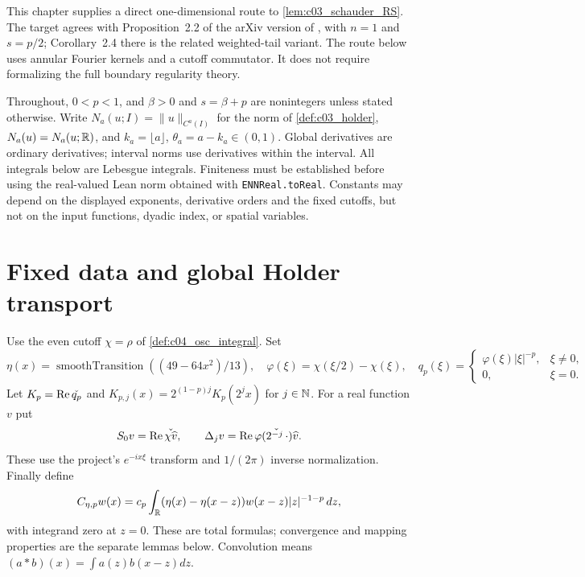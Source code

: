\label{sec:c12_schauder}

This chapter supplies a direct one-dimensional route to \cref{lem:c03_schauder_RS}.
The target agrees with Proposition~2.2 of the arXiv version of
\cite{RosOton-Serra:dirichlet-fractional-laplacian}, with $n=1$ and $s=p/2$;
Corollary~2.4 there is the related weighted-tail variant.
The route below uses annular Fourier kernels and a cutoff commutator. It does not
require formalizing the full boundary regularity theory.

Throughout, $0<p<1$, and $\beta>0$ and $s=\beta+p$ are nonintegers unless stated otherwise.
Write $N_a(u;I)=\|u\|_{C^a(I)}$ for the norm of \cref{def:c03_holder},
$N_a(u)=N_a(u;\R)$, and $k_a=\lfloor a\rfloor$, $\theta_a=a-k_a\in(0,1)$.
Global derivatives are ordinary derivatives; interval norms use derivatives within the interval.
All integrals below are Lebesgue integrals. Finiteness must be established before using the
real-valued Lean norm obtained with \texttt{ENNReal.toReal}.
Constants may depend on the displayed exponents, derivative orders and the fixed cutoffs,
but not on the input functions, dyadic index, or spatial variables.

\section{Fixed data and global Holder transport}

\begin{definition}
  \label{def:c12_schauder_data}
  Use the even cutoff $\chi=\rho$ of \cref{def:c04_osc_integral}. Set
  \[
    \eta(x)=\operatorname{smoothTransition}((49-64x^2)/13),\quad
    \varphi(\xi)=\chi(\xi/2)-\chi(\xi),\quad
    q_p(\xi)=\begin{cases}\varphi(\xi)|\xi|^{-p},&\xi\ne0,\\0,&\xi=0.\end{cases}
  \]
  Let $K_p=\operatorname{Re}\widecheck{q_p}$ and
  $K_{p,j}(x)=2^{(1-p)j}K_p(2^jx)$ for $j\in\N$.
  For a real function $v$ put
  \[
    S_0v=\operatorname{Re}\widecheck{\chi\widehat v},\qquad
    \Delta_jv=\operatorname{Re}\widecheck{\varphi(2^{-j}\,\cdot)\widehat v}.
  \]
  These use the project's $e^{-ix\xi}$ transform and $1/(2\pi)$ inverse normalization.
  Finally define
  \[
    C_{\eta,p}w(x)=c_p\int_\R
       (\eta(x)-\eta(x-z))w(x-z)|z|^{-1-p}\,dz,
  \]
  with integrand zero at $z=0$. These are total formulas; convergence and mapping properties
  are the separate lemmas below. Convolution means $(a*b)(x)=\int a(z)b(x-z)dz$.
\end{definition}

